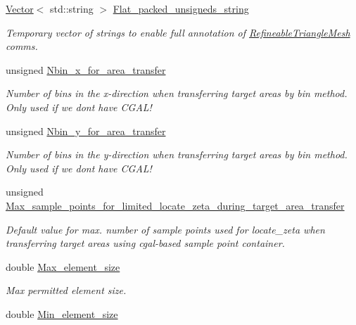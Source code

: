 \begin{DoxyCompactItemize}
\hyperlink{classoomph_1_1Vector}{Vector}$<$ std\+::string $>$ \hyperlink{classoomph_1_1RefineableTriangleMesh_aff72d905fab5ad211c1f7d4b77d24149}{Flat\+\_\+packed\+\_\+unsigneds\+\_\+string}
\begin{DoxyCompactList}\small\item\em Temporary vector of strings to enable full annotation of \hyperlink{classoomph_1_1RefineableTriangleMesh}{Refineable\+Triangle\+Mesh} comms. \end{DoxyCompactList}\item 
unsigned \hyperlink{classoomph_1_1RefineableTriangleMesh_a3a9e90149a6ccc80f1bccca77f46fb2e}{Nbin\+\_\+x\+\_\+for\+\_\+area\+\_\+transfer}
\begin{DoxyCompactList}\small\item\em Number of bins in the x-\/direction when transferring target areas by bin method. Only used if we don\textquotesingle{}t have C\+G\+A\+L! \end{DoxyCompactList}\item 
unsigned \hyperlink{classoomph_1_1RefineableTriangleMesh_af2c7213f1094f8e81e7dbd28b60cff18}{Nbin\+\_\+y\+\_\+for\+\_\+area\+\_\+transfer}
\begin{DoxyCompactList}\small\item\em Number of bins in the y-\/direction when transferring target areas by bin method. Only used if we don\textquotesingle{}t have C\+G\+A\+L! \end{DoxyCompactList}\item 
unsigned \hyperlink{classoomph_1_1RefineableTriangleMesh_a8b3f579874e42d3480734d8e98d689e5}{Max\+\_\+sample\+\_\+points\+\_\+for\+\_\+limited\+\_\+locate\+\_\+zeta\+\_\+during\+\_\+target\+\_\+area\+\_\+transfer}
\begin{DoxyCompactList}\small\item\em Default value for max. number of sample points used for locate\+\_\+zeta when transferring target areas using cgal-\/based sample point container. \end{DoxyCompactList}\item 
double \hyperlink{classoomph_1_1RefineableTriangleMesh_a35205d1ccdc32f0242f75941162f982e}{Max\+\_\+element\+\_\+size}
\begin{DoxyCompactList}\small\item\em Max permitted element size. \end{DoxyCompactList}\item 
double \hyperlink{classoomph_1_1RefineableTriangleMesh_ab242d22770f3248b35553a3eaf08f877}{Min\+\_\+element\+\_\+size}

\end{DoxyCompactItemize}
